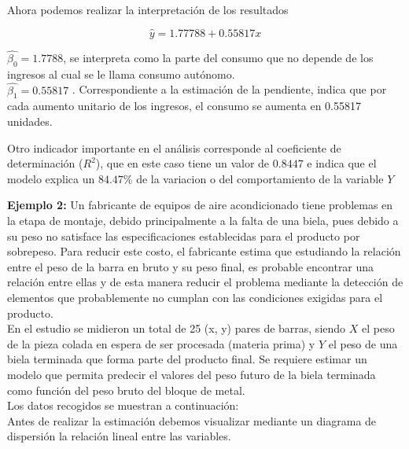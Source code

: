 \documentclass[base=hide,12pt]{elegantbook}
\begin{document}
Ahora podemos realizar la interpretación de los resultados

$$\widehat{y} = 1.77788 + 0.55817 x$$

$\widehat{\beta_{0}} = 1.7788$, se interpreta como la parte del consumo que no depende de los ingresos al cual se le llama consumo autónomo.\\

$\widehat{\beta_{1}} = 0.55817$ . Correspondiente a la estimación de la pendiente, indica que por cada aumento unitario de los ingresos, el consumo se aumenta en 0.55817 unidades.
 
Otro indicador importante en el análisis corresponde al coeficiente de determinación ($R^{2}$), que en este caso tiene un valor de $0.8447$ e indica que el modelo explica un $84.47$\% de la variacion o del comportamiento de la variable $Y$


\newpage 
\textcolor{col3}{\bf \large Ejemplo 2:}  Un fabricante de equipos de aire acondicionado tiene problemas en la etapa de montaje, debido principalmente a la falta de una biela, pues debido a su peso no satisface las especificaciones establecidas para el producto por sobrepeso. Para reducir este costo, el fabricante estima que estudiando  la relación entre el peso de la barra en bruto y su peso final, es probable encontrar una relación entre ellas y de esta manera reducir el problema mediante la detección de elementos que probablemente no cumplan con las condiciones exigidas para el producto. \\
	
En el estudio se midieron un total de 25 (x, y) pares de barras, siendo $X$ el peso de la pieza colada en espera de ser procesada (materia prima) y $Y$ el peso de una biela terminada que forma parte del producto final. Se requiere estimar un modelo que permita predecir el valores del peso futuro de la  biela terminada como función del peso bruto del bloque de metal. \\
	
Los datos recogidos se muestran a continuación: \\
	
	Antes de realizar la estimación debemos visualizar mediante un diagrama de dispersión la relación lineal entre las variables. \\
	
\end{document}
